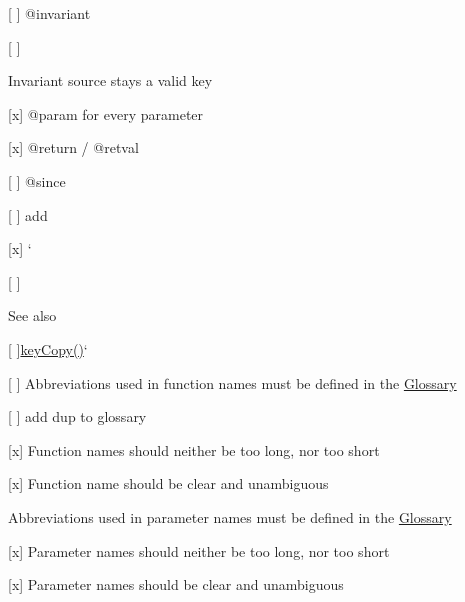 \begin{DoxyItemize}
\begin{DoxyItemize}
\end{DoxyItemize}
\item \mbox{[} \mbox{]} {\ttfamily @invariant}
\begin{DoxyItemize}
\item \mbox{[} \mbox{]} \begin{DoxyInvariant}{Invariant}
source stays a valid key
\end{DoxyInvariant}

\end{DoxyItemize}
\item \mbox{[}x\mbox{]} {\ttfamily @param} for every parameter
\item \mbox{[}x\mbox{]} {\ttfamily @return} / {\ttfamily @retval}
\item \mbox{[} \mbox{]} {\ttfamily @since}
\begin{DoxyItemize}
\item \mbox{[} \mbox{]} add
\end{DoxyItemize}
\item \mbox{[}x\mbox{]} `{\ttfamily }
\item {\ttfamily \mbox{[} \mbox{]}}\begin{DoxySeeAlso}{See also}
{\ttfamily 
\begin{DoxyItemize}
\item \mbox{[} \mbox{]}\hyperlink{group__key_ga505575ebef060066984fe0f590081e37}{key\+Copy()}`
\end{DoxyItemize}}
\end{DoxySeeAlso}

\end{DoxyItemize}

{\ttfamily 
\begin{DoxyItemize}
\item \mbox{[} \mbox{]} Abbreviations used in function names must be defined in the \hyperlink{doc_help_elektra-glossary_md}{Glossary}
\begin{DoxyItemize}
\item \mbox{[} \mbox{]} add dup to glossary
\end{DoxyItemize}
\item \mbox{[}x\mbox{]} Function names should neither be too long, nor too short
\item \mbox{[}x\mbox{]} Function name should be clear and unambiguous
\item Abbreviations used in parameter names must be defined in the \hyperlink{doc_help_elektra-glossary_md}{Glossary}
\item \mbox{[}x\mbox{]} Parameter names should neither be too long, nor too short
\item \mbox{[}x\mbox{]} Parameter names should be clear and unambiguous
\end{DoxyItemize}}

